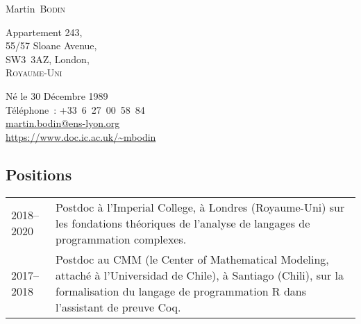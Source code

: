 \documentclass[12pt,a4paper]{article}
\makeatletter
\newcommand{\en}[1]{\foreignlanguage{english}{{#1}}}
\newcommand{\es}[1]{\foreignlanguage{spanish}{{#1}}}
\newcommand{\en}[1]{\foreignlanguage{english}{{#1}}}
\newcommand{\es}[1]{\foreignlanguage{spanish}{{#1}}}
\newenvironment{datecvsection}[1]%
               {\subsection*{#1}%
                 \noindent \begin{tabular}{@{}p{\annee}p{\texte}@{}}}
               {\end{tabular}}
\newcommand\familyName{\textsc}
\newcommand\placeName{}
\makeatother
\begin{document}
\pagestyle{empty}


\newlength{\annee}
\settowidth{\annee}{9999--9999}


\newlength{\texte}
\setlength{\texte}{\textwidth} \addtolength{\texte}{-\annee} 
	\addtolength{\texte}{-2\tabcolsep}

\begin{center} \Huge Martin~\familyName{Bodin} \end{center}

\parbox[c]{.5\textwidth}
{
  \noindent
  Appartement 243, \\
  55/57 Sloane Avenue, \\
  SW3~3AZ, London, \\
  \textsc{Royaume-Uni}
}
\parbox[c]{.55\textwidth}
{
\begin{flushright}
  Né le 30 Décembre 1989 \\
  \noindent Téléphone~: \mbox{+33 6 27 00 58 84} \\
  \url{martin.bodin@ens-lyon.org} \\
  \url{https://www.doc.ic.ac.uk/~mbodin}
\end{flushright}
}


\begin{datecvsection}{Positions}

    2018–2020 & Postdoc à l’\en{\placeName{Imperial College}}, à \placeName{Londres} (\placeName{Royaume-Uni}) sur les fondations théoriques de l’analyse de langages de programmation complexes. \\

    2017–2018 & Postdoc au \placeName{CMM} (le \en{\placeName{Center of Mathematical Modeling}}, attaché à l’\es{\placeName{Universidad de Chile}}), à \placeName{Santiago} (\placeName{Chili}), sur la formalisation du langage de programmation R dans l’assistant de preuve Coq. \\

\end{datecvsection}
\end{document}
